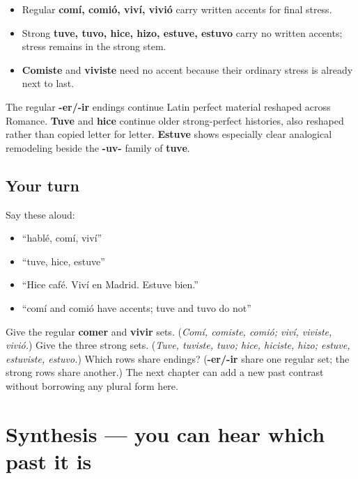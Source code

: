 \begin{grammarlens}[title={Grammar Lens: let spelling show the stress}]
\begin{itemize}
\raggedright
  \item Regular \textbf{comí, comió, viví, vivió} carry written accents for final stress.
  \item Strong \textbf{tuve, tuvo, hice, hizo, estuve, estuvo} carry no written accents; stress remains in the strong stem.
  \item \textbf{Comiste} and \textbf{viviste} need no accent because their ordinary stress is already next to last.
\end{itemize}
\end{grammarlens}

\begin{cousinweb}
The regular \textbf{-er/-ir} endings continue Latin perfect material reshaped across Romance. \textbf{Tuve} and \textbf{hice} continue older strong-perfect histories, also reshaped rather than copied letter for letter. \textbf{Estuve} shows especially clear analogical remodeling beside the \textbf{-uv-} family of \textbf{tuve}.
\end{cousinweb}

\subsection*{Your turn}
Say these aloud:

\begin{itemize}
\raggedright
  \item “hablé, comí, viví”
  \item “tuve, hice, estuve”
  \item “Hice café. Viví en Madrid. Estuve bien.”
  \item “comí and comió have accents; tuve and tuvo do not”
\end{itemize}

\begin{tcolorbox}[breakable,colback=teal!4,colframe=teal!35!black,title={Before you move on}]
Give the regular \textbf{comer} and \textbf{vivir} sets. (\emph{Comí, comiste, comió; viví, viviste, vivió.}) Give the three strong sets. (\emph{Tuve, tuviste, tuvo; hice, hiciste, hizo; estuve, estuviste, estuvo.}) Which rows share endings? (\textbf{-er/-ir} share one regular set; the strong rows share another.) The next chapter can add a new past contrast without borrowing any plural form here.
\end{tcolorbox}
\section[Practice]{Synthesis — you can hear which past it is}


